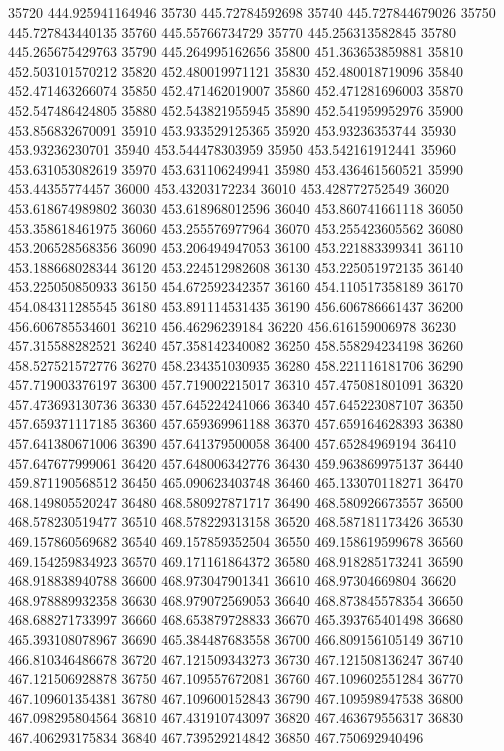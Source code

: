 {35720 444.925941164946
35730 445.72784592698
35740 445.727844679026
35750 445.727843440135
35760 445.55766734729
35770 445.256313582845
35780 445.265675429763
35790 445.264995162656
35800 451.363653859881
35810 452.503101570212
35820 452.480019971121
35830 452.480018719096
35840 452.471463266074
35850 452.471462019007
35860 452.471281696003
35870 452.547486424805
35880 452.543821955945
35890 452.541959952976
35900 453.856832670091
35910 453.933529125365
35920 453.93236353744
35930 453.93236230701
35940 453.544478303959
35950 453.542161912441
35960 453.631053082619
35970 453.631106249941
35980 453.436461560521
35990 453.44355774457
36000 453.43203172234
36010 453.428772752549
36020 453.618674989802
36030 453.618968012596
36040 453.860741661118
36050 453.358618461975
36060 453.255576977964
36070 453.255423605562
36080 453.206528568356
36090 453.206494947053
36100 453.221883399341
36110 453.188668028344
36120 453.224512982608
36130 453.225051972135
36140 453.225050850933
36150 454.672592342357
36160 454.110517358189
36170 454.084311285545
36180 453.891114531435
36190 456.606786661437
36200 456.606785534601
36210 456.46296239184
36220 456.616159006978
36230 457.315588282521
36240 457.358142340082
36250 458.558294234198
36260 458.527521572776
36270 458.234351030935
36280 458.221116181706
36290 457.719003376197
36300 457.719002215017
36310 457.475081801091
36320 457.473693130736
36330 457.645224241066
36340 457.645223087107
36350 457.659371117185
36360 457.659369961188
36370 457.659164628393
36380 457.641380671006
36390 457.641379500058
36400 457.65284969194
36410 457.647677999061
36420 457.648006342776
36430 459.963869975137
36440 459.871190568512
36450 465.090623403748
36460 465.133070118271
36470 468.149805520247
36480 468.580927871717
36490 468.580926673557
36500 468.578230519477
36510 468.578229313158
36520 468.587181173426
36530 469.157860569682
36540 469.157859352504
36550 469.158619599678
36560 469.154259834923
36570 469.171161864372
36580 468.918285173241
36590 468.918838940788
36600 468.973047901341
36610 468.97304669804
36620 468.978889932358
36630 468.979072569053
36640 468.873845578354
36650 468.688271733997
36660 468.653879728833
36670 465.393765401498
36680 465.393108078967
36690 465.384487683558
36700 466.809156105149
36710 466.810346486678
36720 467.121509343273
36730 467.121508136247
36740 467.121506928878
36750 467.109557672081
36760 467.109602551284
36770 467.109601354381
36780 467.109600152843
36790 467.109598947538
36800 467.098295804564
36810 467.431910743097
36820 467.463679556317
36830 467.406293175834
36840 467.739529214842
36850 467.750692940496
}
